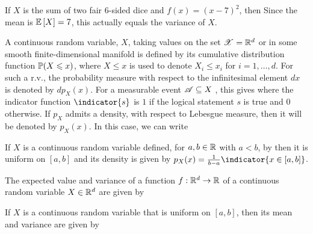 \documentclass[letterpaper,10pt,english]{article}
\begin{document}
\begin{exmp}
If $X$ is the sum of two fair 6-sided dice and $f(x) = (x - 7)^2$, 
then 
Since the mean is $\E{X} = 7$, this actually equals the variance of $X$.
\end{exmp}
\begin{defn} 
A continuous random variable, $X$, taking values on the set $\sX = \R^d$ or in some smooth finite-dimensional manifold is defined by its cumulative distribution function $\P(X \le x)$, where $X \le x$ is used to denote
$X_i \le x_i$ for $i = 1, \dots, d$. For such a r.v., the probability measure with respect to the
infinitesimal element $dx$ is denoted by $dp_X (x)$. 
For a measurable event $\sA \subseteq X$ , this gives 
where the indicator function $\indicator{s}$ is $1$ if the logical statement $s$ is true and $0$ otherwise. 
If $p_X$ admits a density, with respect to Lebesgue measure, then it will be denoted by $p_X(x)$. 
In this case, we can write
\end{defn}
\begin{exmp}
If $X$ is a continuous random variable defined, for $a, b \in \R$ with $a < b$, by
then it is uniform on $[a, b]$ and its density is given by $p_X (x) = \frac{1}{b-a}\indicator{x \in [a,b]}$.
\end{exmp}

\begin{defn} 
The expected value and variance of a function $f : \R^d \to \R$ of a continuous
random variable $X \in \R^d$ are given by
\end{defn}
\begin{exmp} 
If $X$ is a continuous random variable that is uniform on $[a, b]$, 
then its mean and variance are given by
\end{exmp}
     
\end{document}
